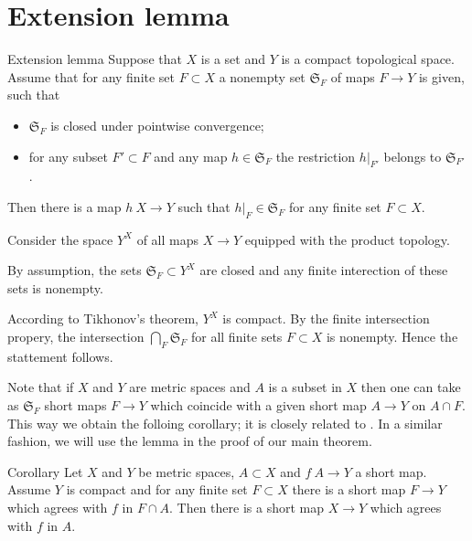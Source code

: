 \section{Extension lemma}\label{Finite-whole extension lemma}

\begin{thm}{Extension lemma}\label{lem:finite-whole}
Suppose that $X$ is a set 
and $Y$ is a compact topological space.
Assume that for any finite set $F\subset X$ 
a nonempty set $\mathfrak{S}_F$ of maps  $F\to Y$ is given, such that
\begin{itemize}
\item $\mathfrak{S}_F$ is closed under pointwise convergence;
\item for any subset $F'\subset F$ and any map $h\in \mathfrak{S}_F$
the restriction $h|_{F'}$ belongs to $\mathfrak{S}_{F'}$. 
\end{itemize}

Then there is a map $h\: X\to Y$ such that $h|_F\in \mathfrak{S}_F$ for any finite set $F\subset X$.
\end{thm}

Consider the space $Y^X$ of all maps $X\to Y$ equipped with the product topology.


By assumption, the sets $\mathfrak{S}_F\subset Y^X$ are closed and any finite interection of these sets is nonempty.

According to Tikhonov's theorem, $Y^X$ is compact.
By the finite intersection propery, the intersection $\bigcap_F\mathfrak{S}_F$ for all finite sets $F\subset X$ is nonempty.
Hence the stattement follows.
\qeds

Note that if $X$ and $Y$ are metric spaces and $A$ is a subset in $X$
then one can take as $\mathfrak{S}_F$ short maps $F\to Y$ which coincide with a given short map $A\to Y$ on $A\cap F$.
This way we obtain the folloing corollary; it is closely related to \cite[Proposition 5.2]{lang-shroeder}.
In a similar fashion, we will use the lemma in the proof of our main theorem.

\begin{thm}{Corollary}
Let $X$ and $Y$ be metric spaces, $A\subset X$ and $f\:A\to Y$ a short map.
Assume $Y$ is compact and for any finite set $F\subset X$ there is a short map $F\to Y$ which agrees with $f$ in $F\cap A$.
Then there is a short map $X\to Y$ which agrees with $f$ in $A$.
\end{thm}